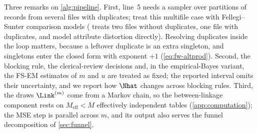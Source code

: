 Three remarks on \cref{alg:pipeline}. First, line~5 needs a sampler over partitions of records from several files with duplicates; \citet{aleshinguendel2023} treat this multifile case with Fellegi--Sunter comparison models (\citet{sadinle2017} treats two files without duplicates, \citet{sadinle2014} one file with duplicates, and \citet{steorts2016} model attribute distortion directly). Resolving duplicates inside the loop matters, because a leftover duplicate is an extra singleton, and singletons enter the closed form with exponent $+1$ (\cref{eq:fw-altprod}). Second, the blocking rule, the clerical-review decisions and, in the empirical-Bayes variant, the FS-EM estimates of $m$ and $u$ are treated as fixed; the reported interval omits their uncertainty, and we report how $\Nhat$ changes across blocking rules. Third, the draws $\Link^{(m)}$ come from a Markov chain, so the between-linkage component rests on $M_{\mathrm{eff}}<M$ effectively independent tables (\cref{app:computation}); the MSE step is parallel across $m$, and its output also serves the funnel decomposition of \cref{sec:funnel}.
